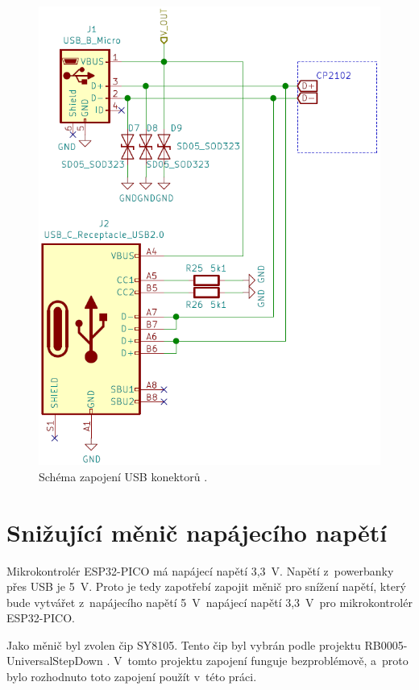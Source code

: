   \begin{figure}[!h]
    \begin{center}
      \includegraphics[scale=0.5]{obrazky/Obe_USB_schema.png}
    \end{center}
    \caption[Schéma zapojení USB konektorů \cite{USB-C}]{Schéma zapojení USB konektorů \cite{USB-C}.}
  \end{figure}

  \section{Snižující měnič napájecího napětí}
  Mikrokontrolér ESP32-PICO má napájecí napětí 3,3~V. Napětí z~powerbanky přes USB je 5~V. Proto je tedy zapotřebí zapojit 
  měnič pro snížení napětí, který bude vytvářet z~napájecího napětí 5~V~napájecí napětí 3,3~V~pro mikrokontrolér ESP32-PICO.

  Jako měnič byl zvolen čip SY8105. Tento čip byl vybrán podle projektu RB0005-UniversalStepDown \cite{UniversalStepDown}. 
  V~tomto projektu zapojení funguje bezproblémově, a~proto bylo rozhodnuto toto zapojení použít v~této práci. 

